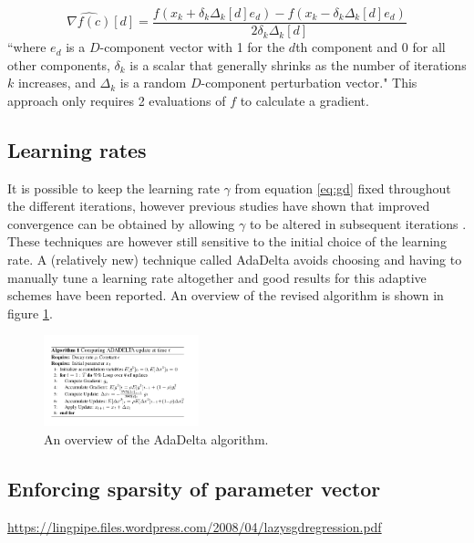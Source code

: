 \begin{equation}
 \hat{\nabla f(c)}[d] = \frac{f(x_k + \delta_k\Delta_k[d]e_d) - f(x_k - \delta_k\Delta_k[d]e_d)}{2\delta_k\Delta_k[d]}
\end{equation}
``where $e_d$ is a $D$-component vector with 1 for the $d$th component and 0 for all other components, $\delta_k$ is a 
scalar that generally shrinks as the number of iterations $k$ increases, and $\Delta_k$ is a random $D$-component perturbation
vector."
This approach only requires 2 evaluations of $f$ to calculate a gradient.

 
\subsection{Learning rates}
It is possible to keep the learning rate $\gamma$ from equation \ref{eq:gd} fixed throughout the different iterations, however previous studies have shown that improved convergence can be obtained by allowing
$\gamma$ to be altered in subsequent iterations \cite{jacobs1988increased}. These techniques are however still sensitive to the initial choice of the learning rate. A (relatively new) technique called AdaDelta\cite{zeiler2012adadelta}
avoids choosing and having to manually tune a learning rate altogether and good results for this adaptive schemes have been reported. An overview of the revised algorithm is shown in figure \ref{fig:adadelta}.
\begin{figure}	
    \centering
    \includegraphics[width=0.4\textwidth]{images/ada_delta.png}
    \caption{ An overview of the AdaDelta algorithm. }
    \label{fig:adadelta}
\end{figure}
\subsection{Enforcing sparsity of parameter vector}
\url{https://lingpipe.files.wordpress.com/2008/04/lazysgdregression.pdf}
